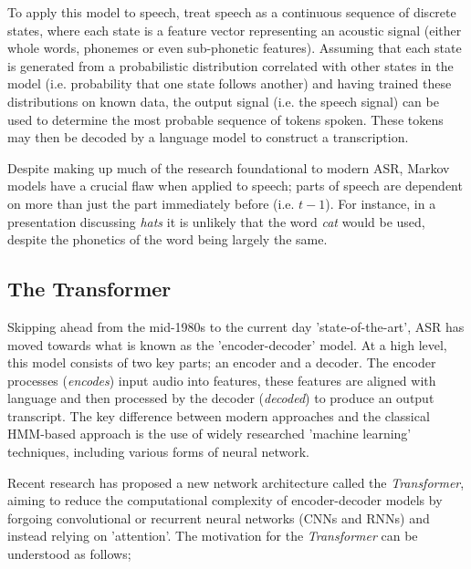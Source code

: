 To apply this model to speech, treat speech as a continuous sequence of discrete states, where each state is a feature vector representing an acoustic signal (either whole words, phonemes or even sub-phonetic features\cite{bengio1999markovian}).
Assuming that each state is generated from a probabilistic distribution correlated with other states in the model\cite{Rabiner1989Feb} (i.e. probability that one state follows another) and having trained these distributions on known data, the output signal (i.e. the speech signal) can be used to determine the most probable sequence of tokens spoken.
These tokens may then be decoded by a language model to construct a transcription\cite{bengio1999markovian}.

Despite making up much of the research foundational to modern ASR, Markov models have a crucial flaw when applied to speech; parts of speech are dependent on more than just the part immediately before (i.e. $t-1$).
For instance, in a presentation discussing \emph{hats} it is unlikely that the word \emph{cat} would be used, despite the phonetics of the word being largely the same.

\subsection{The Transformer}\label{subsec:modern-asr}

Skipping ahead from the mid-1980s to the current day 'state-of-the-art', ASR has moved towards what is known as the 'encoder-decoder' model.
At a high level, this model consists of two key parts; an encoder and a decoder.
The encoder processes (\emph{encodes}) input audio into features, these features are aligned with language and then processed by the decoder (\emph{decoded}) to produce an output transcript\cite{wang2019overview}.
The key difference between modern approaches and the classical HMM-based approach is the use of widely researched 'machine learning' techniques, including various forms of neural network\cite{mustafa2019comparative, amodei2016deep, hori2017advances, Kim2017Mar}.

Recent research has proposed a new network architecture called the \emph{Transformer}\cite{vaswani2017attention}, aiming to reduce the computational complexity of encoder-decoder models by forgoing convolutional or recurrent neural networks (CNNs and RNNs) and instead relying on 'attention'.
The motivation for the \emph{Transformer} can be understood as follows;

